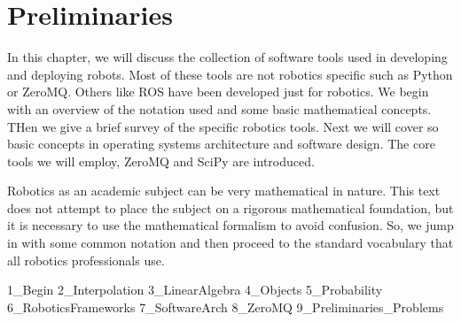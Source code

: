 \hypertarget{Chap:Preliminaries}{%
\section{Preliminaries}\label{Chap:Preliminaries}}

In this chapter, we will discuss the collection of software tools used
in developing and deploying robots. Most of these tools are not robotics
specific such as Python or ZeroMQ. Others like ROS have been developed
just for robotics. We begin with an overview of the notation used and
some basic mathematical concepts. THen we give a brief survey of the
specific robotics tools. Next we will cover so basic concepts in
operating systems architecture and software design. The core tools we
will employ, ZeroMQ and SciPy are introduced.

Robotics as an academic subject can be very mathematical in nature. This
text does not attempt to place the subject on a rigorous mathematical
foundation, but it is necessary to use the mathematical formalism to
avoid confusion. So, we jump in with some common notation and then
proceed to the standard vocabulary that all robotics professionals use.

1\_Begin 2\_Interpolation 3\_LinearAlgebra 4\_Objects 5\_Probability
6\_RoboticsFrameworks 7\_SoftwareArch 8\_ZeroMQ
9\_Preliminaries\_Problems
